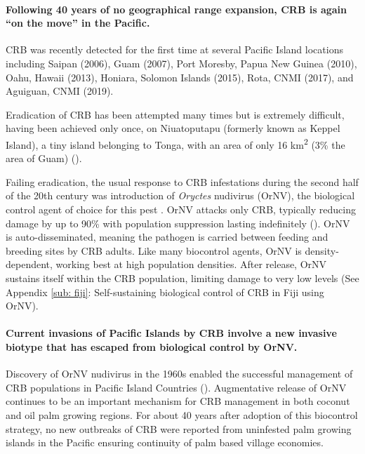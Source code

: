 \documentclass[12pt,letterpaper,english,bibliography=totocnumbered, abstract=on]{scrartcl}
\begin{document}
\paragraph{Following 40 years of no geographical range expansion, CRB is again
``on the move'' in the Pacific.}

CRB was recently detected for the first time at several Pacific Island
locations including Saipan (2006), Guam (2007), Port Moresby, Papua
New Guinea (2010), Oahu, Hawaii (2013), Honiara, Solomon Islands
(2015), Rota, CNMI (2017), and Aguiguan, CNMI (2019). 

Eradication of CRB has been attempted many times but is extremely
difficult, having been achieved only once, on Niuatoputapu (formerly
known as Keppel Island), a tiny island belonging to Tonga, with an
area of only 16 km\textsuperscript{2} (3\% the area of Guam) (\cite{catley_coconut_1969}).

Failing eradication, the usual response to CRB infestations during
the second half of the 20th century was introduction of \emph{Oryctes}
nudivirus (OrNV), the biological control agent of choice for this
pest \cite{jackson_use_2009-1} . OrNV attacks only CRB, typically
reducing damage by up to 90\% with population suppression lasting
indefinitely (\cite{bedford_g._o._long-term_2013}). OrNV is auto-disseminated,
meaning the pathogen is carried between feeding and breeding sites
by CRB adults. Like many biocontrol agents, OrNV is density-dependent,
working best at high population densities. After release, OrNV sustains itself within the 
CRB population, limiting damage to very low levels (See Appendix \ref{sub: fiji}: Self-sustaining biological control of CRB in Fiji using OrNV). 

\paragraph*{Current invasions of Pacific Islands by CRB involve a new invasive
biotype that has escaped from biological control by OrNV. }

Discovery of OrNV nudivirus in the 1960s enabled the successful management
of CRB populations in Pacific Island Countries (\cite{huger_oryctes_2005-1}).
Augmentative release of OrNV continues to be an important mechanism
for CRB management in both coconut and oil palm growing regions. For
about 40 years after adoption of this biocontrol strategy,
no new outbreaks of CRB were reported from uninfested palm growing
islands in the Pacific ensuring continuity of palm based village economies. 
\end{document}
